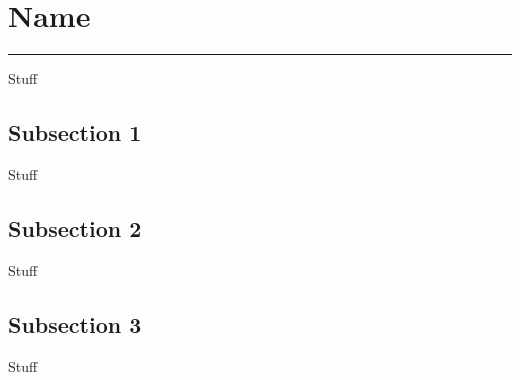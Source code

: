 
\section{Name}

\rule{\textwidth{}}{0.5pt}

Stuff

\subsection{Subsection 1}

Stuff

\subsection{Subsection 2}

Stuff

\subsection{Subsection 3}

Stuff

\newpage